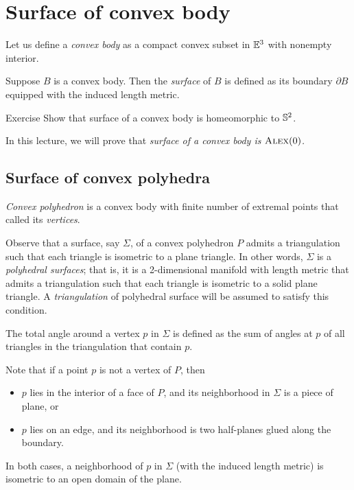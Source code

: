 \chapter{Surface of convex body}\label{chap:convex-body}

Let us define a \emph{convex body} as a compact convex subset in $\mathbb{E}^3$ with nonempty interior.

Suppose $B$ is a convex body.
Then the \emph{surface} of $B$ is defined as its boundary $\partial B$ equipped with the induced length metric.

\begin{thm}{Exercise}\label{ex:surf-S2}
Show that surface of a convex body is homeomorphic to $\mathbb{S}^2$.
\end{thm}

In this lecture, we will prove that \textit{surface of a convex body is $\textsc{Alex}(0)$.}


\section{Surface of convex polyhedra}

\emph{Convex polyhedron} is a convex body with finite number of extremal points that called its \emph{vertices}.

Observe that a surface, say $\Sigma$, of a convex polyhedron $P$ admits a triangulation such that each triangle is isometric to a plane triangle.
In other words, $\Sigma$ is a \emph{polyhedral surfaces};
that is, it is a 2-dimensional manifold with length metric that admits a triangulation such that each triangle is isometric to a solid plane triangle.
A \emph{triangulation} of polyhedral surface will be assumed to satisfy this condition.

The total angle around a vertex $p$ in $\Sigma$ is defined as the sum of angles at $p$ of all triangles in the triangulation that contain $p$.

Note that if a point $p$ is not a vertex of $P$,
then
\begin{itemize}
\item $p$ lies in the interior of a face of $P$, and its neighborhood in $\Sigma$ is a piece of plane, or
\item $p$ lies on an edge, and its neighborhood is two half-planes glued along the boundary.
\end{itemize}
In both cases, a neighborhood of $p$ in $\Sigma$ (with the induced length metric) is isometric to an open domain of the plane.

